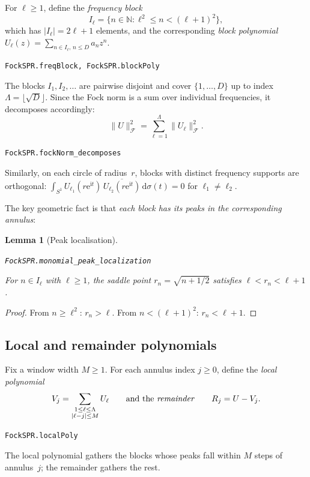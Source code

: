 \documentclass[11pt]{amsart}
\newtheorem{lemma}[theorem]{Lemma}
\theoremstyle{definition}
\theoremstyle{remark}
\begin{document}
For $\ell \ge 1$, define the \emph{frequency block}
\[
I_\ell = \bigl\{n \in \mathbb{N} : \ell^2 \le n < (\ell+1)^2\bigr\},
\]
which has $\lvert I_\ell \rvert = 2\ell+1$ elements, and the corresponding
\emph{block polynomial}
$U_\ell(z) = \sum_{n \in I_\ell,\, n \le D} a_n z^n$.
\par\noindent\texttt{FockSPR.freqBlock, FockSPR.blockPoly}\par\smallskip
The blocks $I_1, I_2, \dots$ are pairwise disjoint and cover
$\{1, \dots, D\}$ up to index $\Lambda = \lfloor\sqrt{D}\rfloor$.  Since the
Fock norm is a sum over individual frequencies, it decomposes accordingly:
\begin{equation}\label{eq:fock-decomp}
\lVert U \rVert_\mathcal{F}^2 = \sum_{\ell=1}^{\Lambda} \lVert U_\ell \rVert_\mathcal{F}^2.
\end{equation}
\par\noindent\texttt{FockSPR.fockNorm\_decomposes}\par\smallskip
Similarly, on each circle of radius~$r$, blocks with distinct frequency
supports are orthogonal:
$\int_{S^1} U_{\ell_1}(r\mathrm{e}^{\mathrm{i} t})\,
\overline{U_{\ell_2}(r\mathrm{e}^{\mathrm{i} t})}\,\mathrm{d}\sigma(t) = 0$
for $\ell_1 \ne \ell_2$.

The key geometric fact is that \emph{each block has its peaks in the
corresponding annulus}:

\begin{lemma}[Peak localisation]\label{lem:peak}
\par\noindent\texttt{FockSPR.monomial\_peak\_localization}\par\smallskip
For $n \in I_\ell$ with $\ell \ge 1$, the saddle point
$r_n = \sqrt{n + 1/2}$ satisfies $\ell < r_n < \ell + 1$.
\end{lemma}

\begin{proof}
From $n \ge \ell^2$: $r_n > \ell$.  From $n < (\ell+1)^2$:
$r_n < \ell + 1$.
\end{proof}

\subsection{Local and remainder polynomials}\label{sec:local-remainder}

Fix a window width $M \ge 1$.  For each annulus index $j \ge 0$, define the
\emph{local polynomial}
\[
V_j = \sum_{\substack{1 \le \ell \le \Lambda \\ \lvert \ell - j \rvert \le M}} U_\ell
\qquad\text{and the \emph{remainder}}\qquad
R_j = U - V_j.
\]
\par\noindent\texttt{FockSPR.localPoly}\par\smallskip
The local polynomial gathers the blocks whose peaks fall within $M$ steps of
annulus~$j$; the remainder gathers the rest.
\end{document}
